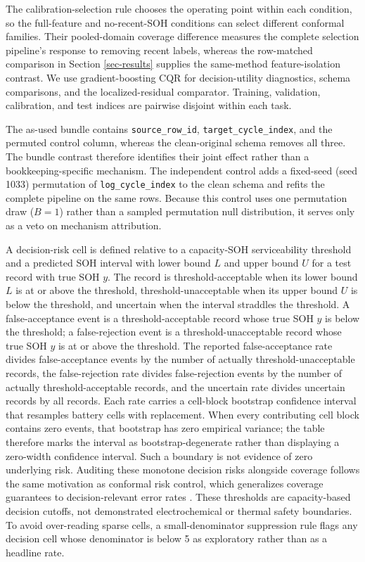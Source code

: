 \documentclass[
  number,
  preprint]{elsarticle}
\begin{document}
The calibration-selection rule chooses the operating point within each
condition, so the full-feature and no-recent-SOH conditions can select
different conformal families. Their pooled-domain coverage difference
measures the complete selection pipeline's response to removing recent
labels, whereas the row-matched comparison in Section \ref{sec-results}
supplies the same-method feature-isolation contrast. We use
gradient-boosting CQR for decision-utility diagnostics, schema
comparisons, and the localized-residual comparator. Training,
validation, calibration, and test indices are pairwise disjoint within
each task.

The as-used bundle contains \texttt{source\_row\_id},
\texttt{target\_cycle\_index}, and the permuted control column, whereas
the clean-original schema removes all three. The bundle contrast
therefore identifies their joint effect rather than a
bookkeeping-specific mechanism. The independent control adds a
fixed-seed (seed 1033) permutation of \texttt{log\_cycle\_index} to the
clean schema and refits the complete pipeline on the same rows. Because
this control uses one permutation draw (\(B=1\)) rather than a sampled
permutation null distribution, it serves only as a veto on mechanism
attribution.

A decision-risk cell is defined relative to a capacity-SOH
serviceability threshold and a predicted SOH interval with lower bound
\(L\) and upper bound \(U\) for a test record with true SOH \(y\). The
record is threshold-acceptable when its lower bound \(L\) is at or above
the threshold, threshold-unacceptable when its upper bound \(U\) is
below the threshold, and uncertain when the interval straddles the
threshold. A false-acceptance event is a threshold-acceptable record
whose true SOH \(y\) is below the threshold; a false-rejection event is
a threshold-unacceptable record whose true SOH \(y\) is at or above the
threshold. The reported false-acceptance rate divides false-acceptance
events by the number of actually threshold-unacceptable records, the
false-rejection rate divides false-rejection events by the number of
actually threshold-acceptable records, and the uncertain rate divides
uncertain records by all records. Each rate carries a cell-block
bootstrap confidence interval that resamples battery cells with
replacement. When every contributing cell block contains zero events,
that bootstrap has zero empirical variance; the table therefore marks
the interval as bootstrap-degenerate rather than displaying a zero-width
confidence interval. Such a boundary is not evidence of zero underlying
risk. Auditing these monotone decision risks alongside coverage follows
the same motivation as conformal risk control, which generalizes
coverage guarantees to decision-relevant error rates
\citep{angelopoulos2024conformalrisk}. These thresholds are
capacity-based decision cutoffs, not demonstrated electrochemical or
thermal safety boundaries. To avoid over-reading sparse cells, a
small-denominator suppression rule flags any decision cell whose
denominator is below 5 as exploratory rather than as a headline rate.
\end{document}
